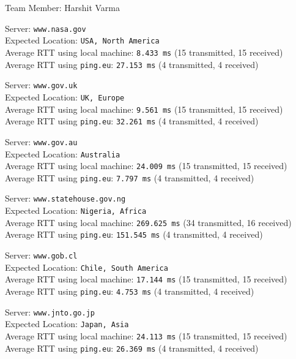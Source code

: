 \documentclass[11pt, fleqn]{article}
\begin{document}
Team Member: Harshit Varma

\hrulefill
\smallskip

Server: \texttt{www.nasa.gov} \\
Expected Location: \texttt{USA, North America}\\
Average RTT using local machine: \texttt{8.433 ms} (15 transmitted, 15 received)\\
Average RTT using \texttt{ping.eu}: \texttt{27.153 ms} (4 transmitted, 4 received)

\hrulefill
\smallskip

Server: \texttt{www.gov.uk}\\
Expected Location: \texttt{UK, Europe}\\
Average RTT using local machine: \texttt{9.561 ms} (15 transmitted, 15 received)\\
Average RTT using \texttt{ping.eu}: \texttt{32.261 ms} (4 transmitted, 4 received)

\hrulefill
\smallskip

Server: \texttt{www.gov.au}\\
Expected Location: \texttt{Australia}\\
Average RTT using local machine: \texttt{24.009 ms} (15 transmitted, 15 received)\\
Average RTT using \texttt{ping.eu}: \texttt{7.797 ms} (4 transmitted, 4 received)

\hrulefill
\smallskip

Server: \texttt{www.statehouse.gov.ng}\\
Expected Location: \texttt{Nigeria, Africa}\\
Average RTT using local machine: \texttt{269.625 ms} (34 transmitted, 16 received)\\
Average RTT using \texttt{ping.eu}: \texttt{151.545 ms} (4 transmitted, 4 received)


\hrulefill
\smallskip

Server: \texttt{www.gob.cl}\\
Expected Location: \texttt{Chile, South America}\\
Average RTT using local machine: \texttt{17.144 ms} (15 transmitted, 15 received)\\
Average RTT using \texttt{ping.eu}: \texttt{4.753 ms} (4 transmitted, 4 received)

\hrulefill
\smallskip

Server: \texttt{www.jnto.go.jp}\\
Expected Location: \texttt{Japan, Asia}\\
Average RTT using local machine: \texttt{24.113 ms} (15 transmitted, 15 received)\\
Average RTT using \texttt{ping.eu}: \texttt{26.369 ms} (4 transmitted, 4 received)
\end{document}
